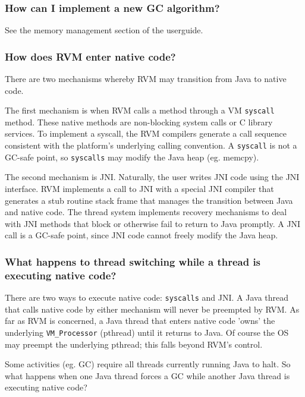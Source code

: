 \subsubsection{How can I implement a new GC algorithm?}

See the memory management section of the userguide.

\subsubsection{How does RVM enter native code?}

There are two mechanisms whereby RVM may transition from Java to native
code.

The first mechanism is when RVM calls a method through a VM {\tt syscall}
method.  These native methods are non-blocking system calls or C library 
services.  To implement a syscall, the RVM compilers generate a call
sequence consistent with the platform's underlying calling convention.
A {\tt syscall} is not a GC-safe point, so {\tt syscalls} may modify the
Java heap (eg. memcpy).

The second mechanism is JNI.  Naturally, the user writes JNI code 
using the JNI interface.  RVM implements a call to JNI with a special JNI
compiler that generates a stub routine stack frame that manages the
transition between Java and native code.  The thread system implements 
recovery mechanisms to deal with JNI methods that block or otherwise fail
to return to Java promptly.  A JNI call is a GC-safe point, since JNI code
cannot freely modify the Java heap.

\subsubsection{What happens to thread switching while a thread is
executing native code?}


There are two ways to execute native code: {\tt syscalls} and JNI.
A Java thread that calls native code by either mechanism will never
be preempted by RVM.  As far as RVM is concerned, a Java thread that
enters native code 'owns' the underlying {\tt VM\_Processor} (pthread)
until it returns to Java.  Of course the OS may preempt the underlying
pthread; this falls beyond RVM's control.

Some activities (eg. GC) require all threads currently running Java to halt.  
So what happens when one Java thread forces a GC while another Java thread is
executing native code?

